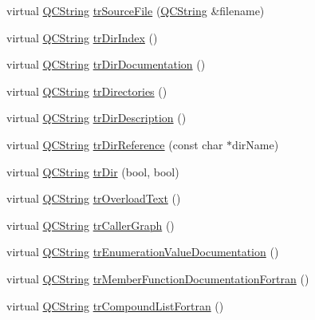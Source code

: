 \begin{DoxyCompactItemize}
\item 
virtual \mbox{\hyperlink{class_q_c_string}{Q\+C\+String}} \mbox{\hyperlink{class_translator_chinese_ad5a765d26a7fe9bda8830f9641ab80eb}{tr\+Source\+File}} (\mbox{\hyperlink{class_q_c_string}{Q\+C\+String}} \&filename)
\item 
virtual \mbox{\hyperlink{class_q_c_string}{Q\+C\+String}} \mbox{\hyperlink{class_translator_chinese_a2ec4e8582f096292cd5c4314612bf84c}{tr\+Dir\+Index}} ()
\item 
virtual \mbox{\hyperlink{class_q_c_string}{Q\+C\+String}} \mbox{\hyperlink{class_translator_chinese_afe8633c6f4e696e07e0742aefa455880}{tr\+Dir\+Documentation}} ()
\item 
virtual \mbox{\hyperlink{class_q_c_string}{Q\+C\+String}} \mbox{\hyperlink{class_translator_chinese_a286bf010583e4103b90c6e1b7ad5c8dc}{tr\+Directories}} ()
\item 
virtual \mbox{\hyperlink{class_q_c_string}{Q\+C\+String}} \mbox{\hyperlink{class_translator_chinese_a5fd68cf98e467a72b56c061c0ff78e96}{tr\+Dir\+Description}} ()
\item 
virtual \mbox{\hyperlink{class_q_c_string}{Q\+C\+String}} \mbox{\hyperlink{class_translator_chinese_a082ced768e3f45b78bcff1f1e14c918f}{tr\+Dir\+Reference}} (const char $\ast$dir\+Name)
\item 
virtual \mbox{\hyperlink{class_q_c_string}{Q\+C\+String}} \mbox{\hyperlink{class_translator_chinese_ac39bd93fa1e18ef1949bd9dc43c0257a}{tr\+Dir}} (bool, bool)
\item 
virtual \mbox{\hyperlink{class_q_c_string}{Q\+C\+String}} \mbox{\hyperlink{class_translator_chinese_a0d0a783cec6284c5ecc2b44099cfbdad}{tr\+Overload\+Text}} ()
\item 
virtual \mbox{\hyperlink{class_q_c_string}{Q\+C\+String}} \mbox{\hyperlink{class_translator_chinese_a327d79d0d375dd73eab9cbbabccb5b56}{tr\+Caller\+Graph}} ()
\item 
virtual \mbox{\hyperlink{class_q_c_string}{Q\+C\+String}} \mbox{\hyperlink{class_translator_chinese_aa01255ece3b24f857760bd23e37b2d93}{tr\+Enumeration\+Value\+Documentation}} ()
\item 
virtual \mbox{\hyperlink{class_q_c_string}{Q\+C\+String}} \mbox{\hyperlink{class_translator_chinese_a9c9313cf216b9915066f5bbde00e8788}{tr\+Member\+Function\+Documentation\+Fortran}} ()
\item 
virtual \mbox{\hyperlink{class_q_c_string}{Q\+C\+String}} \mbox{\hyperlink{class_translator_chinese_a0feb78d3ef47ad9e2685d100ef514fbf}{tr\+Compound\+List\+Fortran}} ()

\end{DoxyCompactItemize}
